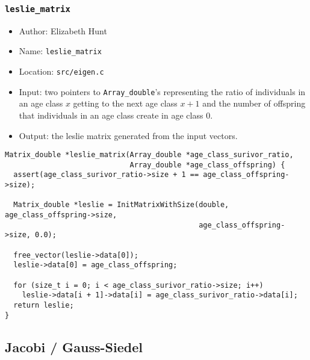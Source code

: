 \documentclass[11pt]{article}
\begin{document}
\subsubsection{\texttt{leslie\_matrix}}
\label{sec:orgca10ed3}
\begin{itemize}
\item Author: Elizabeth Hunt
\item Name: \texttt{leslie\_matrix}
\item Location: \texttt{src/eigen.c}
\item Input: two pointers to \texttt{Array\_double}'s representing the ratio of individuals in an age class
\(x\) getting to the next age class \(x+1\) and the number of offspring that individuals in an age
class create in age class 0.
\item Output: the leslie matrix generated from the input vectors.
\end{itemize}

\begin{verbatim}
Matrix_double *leslie_matrix(Array_double *age_class_surivor_ratio,
                             Array_double *age_class_offspring) {
  assert(age_class_surivor_ratio->size + 1 == age_class_offspring->size);

  Matrix_double *leslie = InitMatrixWithSize(double, age_class_offspring->size,
                                             age_class_offspring->size, 0.0);

  free_vector(leslie->data[0]);
  leslie->data[0] = age_class_offspring;

  for (size_t i = 0; i < age_class_surivor_ratio->size; i++)
    leslie->data[i + 1]->data[i] = age_class_surivor_ratio->data[i];
  return leslie;
}
\end{verbatim}
\subsection{Jacobi / Gauss-Siedel}
\label{sec:org91c563c}
\end{document}
